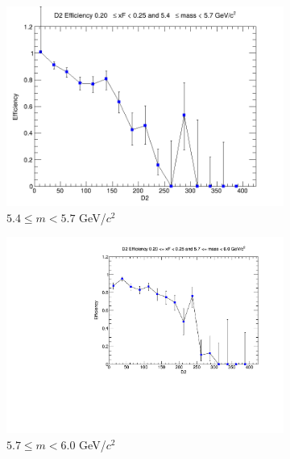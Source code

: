 \begin{figure}[p]
\begin{subfigure}[b]{0.32\textwidth}
        \includegraphics[width=\textwidth]{./kTrackerEfficiencyPlots/D2_Efficiency_xF4_mass4.png}
        \caption{$5.4 \leq m < 5.7$ GeV/$c^2$}
        \label{fig:xF4_mass4}
    \end{subfigure}
    \hfill
    \begin{subfigure}[b]{0.32\textwidth}
        \centering
        \includegraphics[width=\textwidth]{./kTrackerEfficiencyPlots/D2_Efficiency_xF4_mass5.pdf}
        \caption{$5.7 \leq m < 6.0$ GeV/$c^2$}
        \label{fig:xF4_mass5}
    \end{subfigure}
    \vspace{0.5cm}
    \begin{subfigure}[b]{0.32\textwidth}
        \centering

\end{subfigure}
\end{figure}
